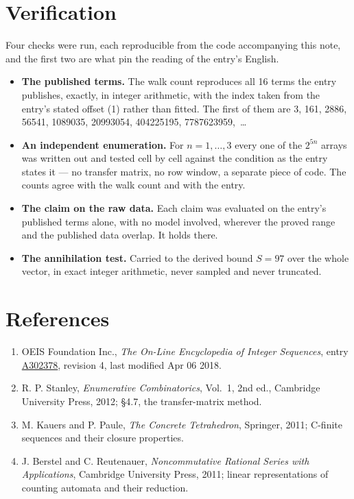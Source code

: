 \documentclass[11pt]{article}
\theoremstyle{definition}
\begin{document}
\section{Verification}

Four checks were run, each reproducible from the code accompanying this note, and the first two are what pin the reading of the entry's English.

\begin{itemize}

\item {\bfseries The published terms.} The walk count reproduces all 16 terms the entry publishes, exactly, in integer arithmetic, with the index taken from the entry's stated offset (1) rather than fitted. The first of them are 3, 161, 2886, 56541, 1089035, 20993054, 404225195, 7787623959,~\dots

\item {\bfseries An independent enumeration.} For $n = 1,\dots,3$ every one of the $2^{5n}$ arrays was written out and tested cell by cell against the condition as the entry states it --- no transfer matrix, no row window, a separate piece of code. The counts agree with the walk count and with the entry.

\item {\bfseries The claim on the raw data.} Each claim was evaluated on the entry's published terms alone, with no model involved, wherever the proved range and the published data overlap. It holds there.

\item {\bfseries The annihilation test.} Carried to the derived bound $S = 97$ over the whole vector, in exact integer arithmetic, never sampled and never truncated.

\end{itemize}

\section{References}

\begin{enumerate}

\item OEIS Foundation Inc., \emph{The On-Line Encyclopedia of Integer Sequences}, entry \href{https://oeis.org/A302378}{A302378}, revision 4, last modified Apr 06 2018.

\item R. P. Stanley, \emph{Enumerative Combinatorics}, Vol.~1, 2nd ed., Cambridge University Press, 2012; \S4.7, the transfer-matrix method.

\item M. Kauers and P. Paule, \emph{The Concrete Tetrahedron}, Springer, 2011; C-finite sequences and their closure properties.

\item J. Berstel and C. Reutenauer, \emph{Noncommutative Rational Series with Applications}, Cambridge University Press, 2011; linear representations of counting automata and their reduction.

\end{enumerate}
\end{document}
